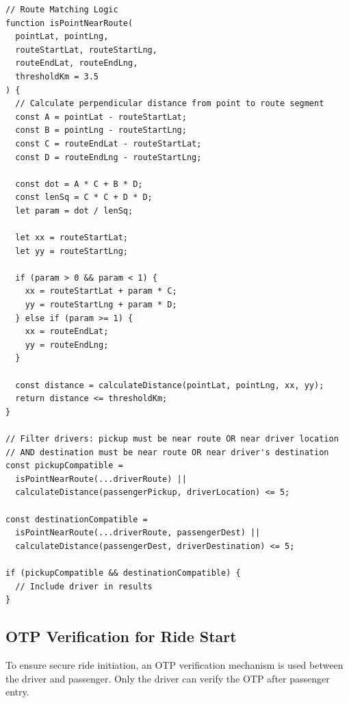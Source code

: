 \documentclass[10pt,a4paper]{report}
\begin{document}
\begin{verbatim}
// Route Matching Logic
function isPointNearRoute(
  pointLat, pointLng,
  routeStartLat, routeStartLng,
  routeEndLat, routeEndLng,
  thresholdKm = 3.5
) {
  // Calculate perpendicular distance from point to route segment
  const A = pointLat - routeStartLat;
  const B = pointLng - routeStartLng;
  const C = routeEndLat - routeStartLat;
  const D = routeEndLng - routeStartLng;
  
  const dot = A * C + B * D;
  const lenSq = C * C + D * D;
  let param = dot / lenSq;
  
  let xx = routeStartLat;
  let yy = routeStartLng;
  
  if (param > 0 && param < 1) {
    xx = routeStartLat + param * C;
    yy = routeStartLng + param * D;
  } else if (param >= 1) {
    xx = routeEndLat;
    yy = routeEndLng;
  }
  
  const distance = calculateDistance(pointLat, pointLng, xx, yy);
  return distance <= thresholdKm;
}

// Filter drivers: pickup must be near route OR near driver location
// AND destination must be near route OR near driver's destination
const pickupCompatible = 
  isPointNearRoute(...driverRoute) || 
  calculateDistance(passengerPickup, driverLocation) <= 5;
  
const destinationCompatible = 
  isPointNearRoute(...driverRoute, passengerDest) || 
  calculateDistance(passengerDest, driverDestination) <= 5;

if (pickupCompatible && destinationCompatible) {
  // Include driver in results
}
\end{verbatim}

\subsection{OTP Verification for Ride Start}

\justify\large To ensure secure ride initiation, an OTP verification mechanism is used between the driver and passenger. Only the driver can verify the OTP after passenger entry.
\end{document}

